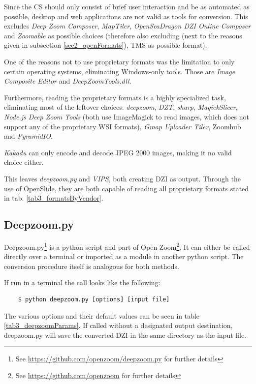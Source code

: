 Since the CS should only consist of brief user interaction and be as automated as possible, desktop and web applications are not valid as tools for conversion. This excludes \emph{Deep Zoom Composer}, \emph{MapTiler}, \emph{OpenSeaDragon DZI Online Composer} and \emph{Zoomable} as possible choices (therefore also excluding (next to the reasons given in subsection \ref{sec2_openFormats}), TMS as possible format).

One of the reasons not to use proprietary formats was the limitation to only certain operating systems, eliminating Windows-only tools. Those are \emph{Image Composite Editor} and \emph{DeepZoomTools.dll}.

Furthermore, reading the proprietary formats is a highly specialized task, eliminating most of the leftover choices: \emph{deepzoom}\cite{web:deepzoom}, \emph{DZT}\cite{web:dzt}, \emph{sharp}\cite{web:sharp}, \emph{MagickSlicer}, \emph{Node.js Deep Zoom Tools} (both use ImageMagick to read images, which does not support any of the proprietary WSI formats\cite{web:imagemagick}), \emph{Gmap Uploader Tiler}\cite{web:gmap}, Zoomhub\cite{web:zoomhub} and \emph{PyramidIO}\cite{web:pyramidio}.

\emph{Kakadu} can only encode and decode JPEG 2000 images\cite{web:openseadragon}, making it no valid choice either.

This leaves \emph{deepzoom.py} and \emph{VIPS}, both creating DZI as output. Through the use of OpenSlide, they are both capable of reading all proprietary formats stated in tab. \ref{tab3_formatsByVendor}\cite{web:openslide}.


\subsection{Deepzoom.py}

Deepzoom.py\footnote{See \url{https://github.com/openzoom/deepzoom.py} for further details} is a python script and part of Open Zoom\footnote{See \url{https://github.com/openzoom} for further details}. It can either be called directly over a terminal or imported as a module in another python script. The conversion procedure itself is analogous for both methods.

If run in a terminal the call looks like the following:

\begin{lstlisting}
	$ python deepzoom.py [options] [input file]
\end{lstlisting}

The various options and their default values can be seen in table \ref{tab3_deepzoomParams}. If called without a designated output destination, deepzoom.py will save the converted DZI in the same directory as the input file.

